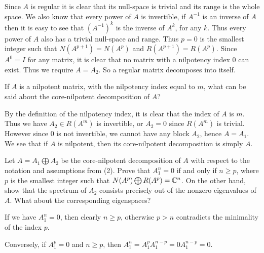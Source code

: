 \documentclass{article}
\begin{document}
\begin{solution}
  Since $A$ is regular it is clear that its null-space is trivial and its range is the whole space.
  We also know that every power of $A$ is invertible, if $A^{-1}$ is an inverse of $A$ then it is easy to see that $(A^{-1})^k$ is the inverse of $A^k$, for any $k$.
  Thus every power of $A$ also has a trivial null-space and range.
  Thus $p = 0$ is the smallest integer such that $N(A^{p + 1}) = N(A^p)$ and $R(A^{p + 1}) = R(A^p)$.
  Since $A^0 = I$ for any matrix, it is clear that no matrix with a nilpotency index $0$ can exist.
  Thus we require $A = A_2$.
  So a regular matrix decomposes into itself.
\end{solution}

\begin{problem}
  If $A$ is a nilpotent matrix, with the nilpotency index equal to $m$, what can be said about the core-nilpotent decomposition of $A$?
\end{problem}

\begin{solution}
  By the definition of the nilpotency index, it is clear that the index of $A$ is $m$.
  Thus we have $A_2 \in R(A^m)$ is invertible, or $A_2 = 0$ since $R(A^m)$ is trivial.
  However since $0$ is not invertible, we cannot have any block $A_2$, hence $A = A_1$.
  We see that if $A$ is nilpotent, then its core-nilpotent decomposition is simply $A$.
\end{solution}

\begin{problem}
  Let $A = A_1 \bigoplus A_2$ be the core-nilpotent decomposition of $A$ with respect to the notation and assumptions from (2).
  Prove that $A_1^n = 0$ if and only if $n \ge p$, where $p$ is the smallest integer such that $N(A^p) \bigoplus R(A^p) = \mathbb{C}^n$.
  On the other hand, show that the spectrum of $A_2$ consists precisely out of the nonzero eigenvalues of $A$.
  What about the corresponding eigenspaces?
\end{problem}

\begin{solution}
  If we have $A_1^n = 0$, then clearly $n \ge p$, otherwise $p > n$ contradicts the minimality of the index $p$.

  Conversely, if $A_1^p = 0$ and $n \ge p$, then $A_1^n = A_1^{p} A_1^{n - p} = 0 A_1^{n - p} = 0$.

\end{solution}
\end{document}
